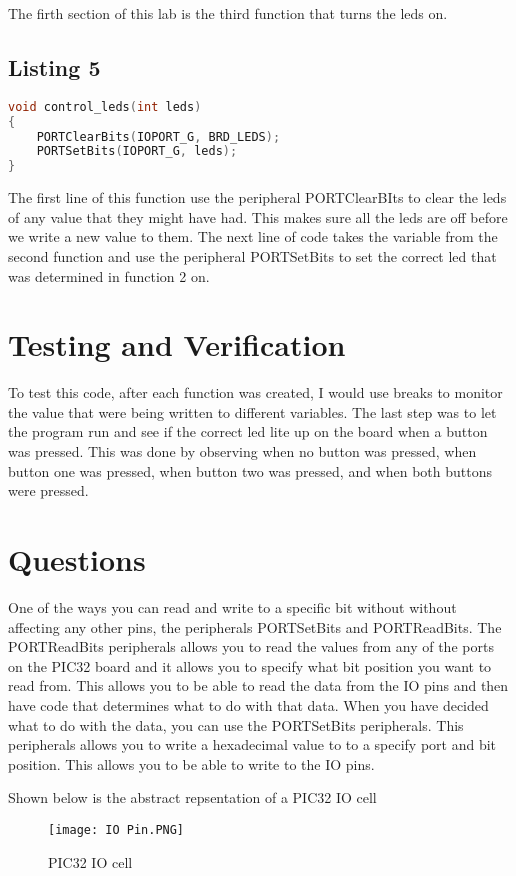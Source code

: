 \documentclass[11pt,a4]{report}
\begin{document}
The firth section of this lab is the third function that turns the leds on. 

\subsection{Listing 5}
\begin{lstlisting}[language=C]
void control_leds(int leds)
{
    PORTClearBits(IOPORT_G, BRD_LEDS);
    PORTSetBits(IOPORT_G, leds);
}	
\end{lstlisting}

The first line of this function use the peripheral PORTClearBIts to clear the leds of any value that they might have had. This makes sure all the leds are off before we write a new value to them. The next line of code takes the variable from the second function and use the peripheral PORTSetBits to set the correct led that was determined in function 2 on. 

\section{Testing and Verification}
To test this code, after each function was created, I would use breaks to monitor the value that were being written to different variables. The last step was to let the program run and see if the correct led lite up on the board when a button was pressed. This was done by observing when no button was pressed, when button one was pressed, when button two was pressed, and when both buttons were pressed. 

\section{Questions}
One of the ways you can read and write to a specific bit without without affecting any other pins, the peripherals PORTSetBits and PORTReadBits. The PORTReadBits peripherals allows you to read the values from any of the ports on the PIC32 board and it allows you to specify what bit position you want to read from. This allows you to be able to read the data from the IO pins and then have code that determines what to do with that data. When you have decided what to do with the data, you can use the PORTSetBits peripherals. This peripherals allows you to write a hexadecimal value to to a specify port and bit position. This allows you to be able to write to the IO pins.

Shown below is the abstract repsentation of a PIC32 IO cell
\begin{figure}[h!]
    \begin{center}
  \caption{PIC32 IO cell}
  \texttt{[image: IO Pin.PNG]}
\end{center}
\end{figure}
\newpage
\end{document}
